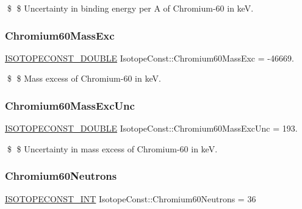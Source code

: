 \$ \$ Uncertainty in binding energy per A of Chromium-\/60 in keV. \mbox{\label{group___isotope_const-_chromium-_cr60_gadaadd185df17bd01d5f8d094be77a0f5}} 
\subsubsection{\texorpdfstring{Chromium60\+Mass\+Exc}{Chromium60MassExc}}
{\footnotesize\ttfamily \mbox{\hyperlink{group___isotope_const-_macros_ga8f45a7272ce02c0b4c65c44636ed719a}{I\+S\+O\+T\+O\+P\+E\+C\+O\+N\+S\+T\+\_\+\+D\+O\+U\+B\+LE}} Isotope\+Const\+::\+Chromium60\+Mass\+Exc = -\/46669.}

\$ \$ Mass excess of Chromium-\/60 in keV. \mbox{\label{group___isotope_const-_chromium-_cr60_ga5932da67db2d813fcd17f04530ac2670}} 
\subsubsection{\texorpdfstring{Chromium60\+Mass\+Exc\+Unc}{Chromium60MassExcUnc}}
{\footnotesize\ttfamily \mbox{\hyperlink{group___isotope_const-_macros_ga8f45a7272ce02c0b4c65c44636ed719a}{I\+S\+O\+T\+O\+P\+E\+C\+O\+N\+S\+T\+\_\+\+D\+O\+U\+B\+LE}} Isotope\+Const\+::\+Chromium60\+Mass\+Exc\+Unc = 193.}

\$ \$ Uncertainty in mass excess of Chromium-\/60 in keV. \mbox{\label{group___isotope_const-_chromium-_cr60_gaab216671f527929b876334f144869ad3}} 
\subsubsection{\texorpdfstring{Chromium60\+Neutrons}{Chromium60Neutrons}}
{\footnotesize\ttfamily \mbox{\hyperlink{group___isotope_const-_macros_ga5f18360b3e99483a35c32d789e62621c}{I\+S\+O\+T\+O\+P\+E\+C\+O\+N\+S\+T\+\_\+\+I\+NT}} Isotope\+Const\+::\+Chromium60\+Neutrons = 36}

